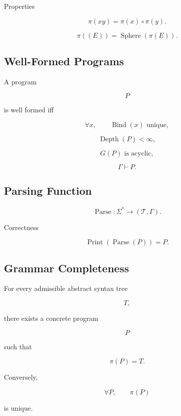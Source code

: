 \documentclass[12pt,oneside]{article}
\theoremstyle{definition}
\theoremstyle{remark}
\begin{document}
Properties

\[
\pi(xy)
=
\pi(x)
\circ
\pi(y).
\]

\[
\pi
(
(E)
)
=
\operatorname{Sphere}
(
\pi(E)
).
\]

\subsection*{Well-Formed Programs}

A program

\[
P
\]

is well formed iff

\[
\forall
x,
\qquad
\operatorname{Bind}(x)
\text{ unique},
\]

\[
\operatorname{Depth}(P)
<
\infty,
\]

\[
G(P)
\text{ is acyclic},
\]

\[
\Gamma
\vdash
P.
\]

\subsection*{Parsing Function}

\[
\operatorname{Parse}
:
\Sigma^*
\rightarrow
(\mathcal T,\Gamma).
\]

Correctness

\[
\operatorname{Print}
(
\operatorname{Parse}(P)
)
=
P.
\]

\subsection*{Grammar Completeness}

For every admissible abstract syntax tree

\[
T,
\]

there exists a concrete program

\[
P
\]

such that

\[
\pi(P)
=
T.
\]

Conversely,

\[
\forall
P,
\qquad
\pi(P)
\]

is unique.

\end{document}
